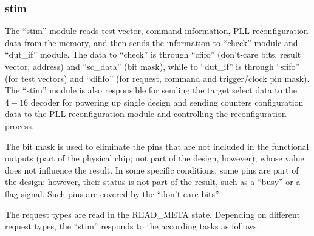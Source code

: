 \subsubsection{stim}
The ``stim'' module reads test vector, command information, PLL reconfiguration data from the memory, and then sends the information to ``check'' module and ``dut\_if'' module. The data to ``check'' is through ``cfifo'' (don’t-care bits, result vector, address) and ``sc\_data'' (bit mask), while to ``dut\_if'' is through ``sfifo'' (for test vectors) and ``dififo'' (for request, command and trigger/clock pin mask). The ``stim'' module is also responsible for sending the target select data to the $4-16$ decoder for powering up single design and sending counters configuration data to the PLL reconfiguration module and controlling the reconfiguration process.

The bit mask is used to eliminate the pins that are not included in the functional outputs (part of the physical chip; not part of the design, however), whose value does not influence the result. In some specific conditions, some pins are part of the design; however, their status is not part of the result, such as a ``busy'' or a flag signal. Such pins are covered by the ``don't-care bits''.


The request types are read in the READ\_META state. Depending on different request types, the ``stim'' responds to the according tasks as follows:


